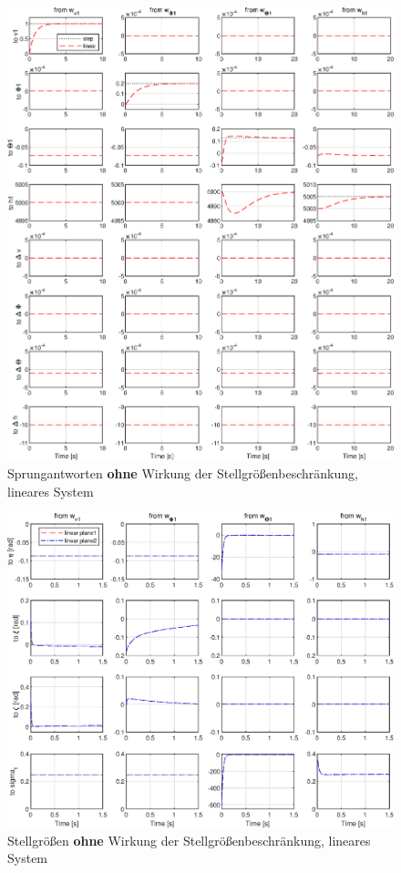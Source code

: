 \begin{figure}[h] %
	\centering
	\includegraphics[width=\linewidth]{./Bilder/outputs_linear_ohne_stellbeschr.eps}
	\caption{Sprungantworten \textbf{ohne} Wirkung der Stellgrößenbeschränkung, lineares System}
	\label{fig:outputs_linear_ohne_stellbesch}
\end{figure}
\begin{figure}[h] %
	\centering
	\includegraphics[width=\linewidth]{./Bilder/stellgr_linear_ohne_stellbeschr.eps}
	\caption{Stellgrößen \textbf{ohne} Wirkung der Stellgrößenbeschränkung, lineares System}
	\label{fig:stellgr_linear_ohne_stellbesch}
\end{figure}

